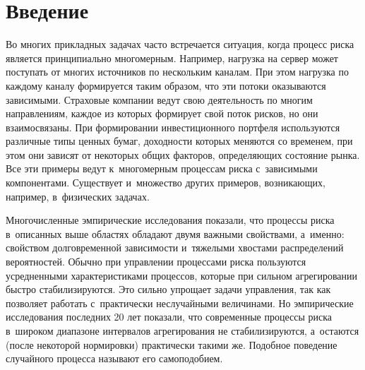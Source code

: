 




\thispagestyle{headings}

\begin{multicols}{2}

\label{st\stat}

\section{Введение}

Во многих прикладных задачах часто встречается ситуация, когда процесс риска является
принципиально многомерным. Например, нагрузка на сервер может поступать от многих источников
по несколь\-ким каналам. При этом нагрузка по каж\-до\-му каналу формируется таким образом, что эти
потоки оказываются зависимыми. Страховые компании ведут свою деятельность по многим 
на\-прав\-ле\-ни\-ям,
каждое из которых формирует свой поток рисков, но они взаимосвязаны.
При формировании инвестиционного портфеля используются различные типы ценных бумаг, доходности
которых меняются со временем, при этом они зависят от некоторых общих факторов, определяющих
состояние рынка. Все эти примеры ведут к~многомерным процессам риска с~зависимыми компонентами.
Существует и~множество других примеров, возника\-ющих, например, в~физических задачах.

Многочисленные эмпирические исследования показали, что процессы риска в~описанных выше областях обладают
двумя важными свойствами, а~именно:  свойством долговременной за\-ви\-си\-мости 
и~тяжелыми хвостами распределений
вероятностей. Обычно при управлении процессами риска пользуются усредненными 
характеристиками процессов,\linebreak
которые при сильном агрегировании быстро ста\-билизируются. Это сильно упрощает задачи 
управ\-ле\-ния,
так как позволяет работать с~практически неслучай\-ными величинами. 
Но эмпирические исследования последних 20 лет
показали, что современные процессы риска в~широком диапазоне интервалов 
агрегирования не стабилизируются,
а~остаются (после некоторой нормировки) практически такими же. 
Подобное поведение случайного процесса
называют его самоподобием.


\end{multicols}
